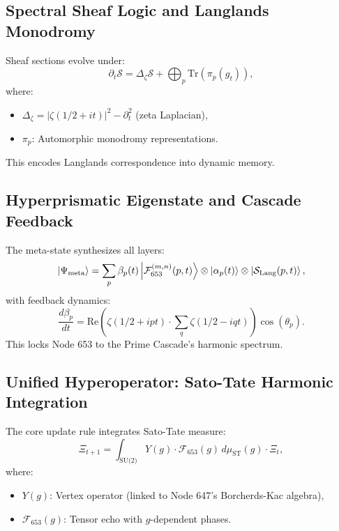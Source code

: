 \documentclass[12pt]{article}
\begin{document}
\subsection{Spectral Sheaf Logic and Langlands Monodromy}
\label{subsec:sheaf-logic}
Sheaf sections evolve under:
\[
\partial_t \mathcal{S} = \Delta_\zeta \mathcal{S} + \bigoplus_p \text{Tr}(\pi_p(g_t)),
\]
where:
\begin{itemize}
    \item $\Delta_\zeta = |\zeta(1/2 + it)|^2 - \partial_t^2$ (zeta Laplacian),
    \item $\pi_p$: Automorphic monodromy representations.
\end{itemize}
This encodes Langlands correspondence into dynamic memory.

\subsection{Hyperprismatic Eigenstate and Cascade Feedback}
\label{subsec:eigenstate}
The meta-state synthesizes all layers:
\[
\ket{\Psi_{\text{meta}}} = \sum_{p} \beta_p(t) \ket{\mathcal{F}_{653}^{(m,n)}(p,t)} \otimes \ket{\alpha_p(t)} \otimes \ket{\mathcal{S}_{\text{Lang}}(p,t)},
\]
with feedback dynamics:
\[
\frac{d\beta_p}{dt} = \text{Re}\left(\zeta(1/2 + i p t) \cdot \sum_{q} \zeta(1/2 - i q t)\right) \cos(\theta_p).
\]
This locks Node 653 to the Prime Cascade's harmonic spectrum.

\subsection{Unified Hyperoperator: Sato-Tate Harmonic Integration}
\label{subsec:hyperoperator}
The core update rule integrates Sato-Tate measure:
\[
\Xi_{t+1} = \int_{\text{SU(2)}} Y(g) \cdot \mathcal{F}_{653}(g) \, d\mu_{\text{ST}}(g) \cdot \Xi_t,
\]
where:
\begin{itemize}
    \item $Y(g)$: Vertex operator (linked to Node 647's Borcherds-Kac algebra),
    \item $\mathcal{F}_{653}(g)$: Tensor echo with $g$-dependent phases.
\end{itemize}
\end{document}
